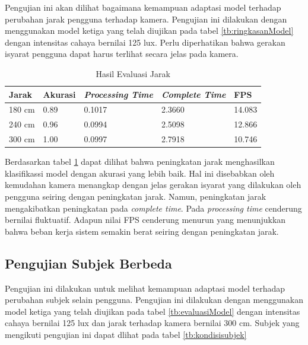 Pengujian ini akan dilihat bagaimana kemampuan adaptasi model terhadap perubahan jarak pengguna terhadap kamera.  Pengujian ini dilakukan dengan menggunakan model ketiga yang telah diujikan pada tabel \ref{tb:ringkasanModel} dengan intensitas cahaya bernilai 125 lux. Perlu diperhatikan bahwa gerakan isyarat pengguna dapat harus terlihat secara jelas pada kamera. 

\begin{table}[H]
  \caption{Hasil Evaluasi Jarak}
  \label{tb:evaluasiJarak}
  \centering
  \begin{tabular}{lllll}
    \hline
    \textbf{Jarak} & \textbf{Akurasi} & \emph{\textbf{Processing Time}} & \emph{\textbf{Complete Time}} & \textbf{FPS}\\
    \hline
    180 cm & 0.89 & 0.1017 & 2.3660 & 14.083\\
    240 cm & 0.96 & 0.0994 & 2.5098 & 12.866\\
    300 cm & 1.00 & 0.0997 & 2.7918 & 10.746\\
    \hline
  \end{tabular}
\end{table}

Berdasarkan tabel \ref{tb:evaluasiJarak} dapat dilihat bahwa peningkatan jarak menghasilkan klasifikassi model dengan akurasi yang lebih baik. Hal ini disebabkan oleh kemudahan kamera menangkap dengan jelas gerakan isyarat yang dilakukan oleh pengguna seiring dengan peningkatan jarak. Namun, peningkatan jarak mengakibatkan peningkatan pada \emph{complete time}. Pada \emph{processing time} cenderung bernilai fluktuatif. Adapun nilai FPS cenderung menurun yang menunjukkan bahwa beban kerja sistem semakin berat seiring dengan peningkatan jarak.

\subsection{Pengujian Subjek Berbeda}
\label{sec:analisissubjek}

Pengujian ini dilakukan untuk melihat kemampuan adaptasi model terhadap perubahan subjek selain pengguna. Pengujian ini dilakukan dengan menggunakan model ketiga yang telah diujikan pada tabel \ref{tb:evaluasiModel} dengan intensitas cahaya bernilai 125 lux dan jarak terhadap kamera bernilai 300 cm. Subjek yang mengikuti pengujian ini dapat dlihat pada tabel \ref{tb:kondisisubjek}

